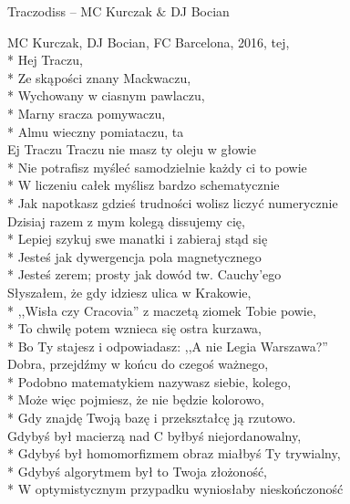 \begin{piosenka_dluga}{Traczodiss -- MC Kurczak $\&$ DJ Bocian}

MC Kurczak, DJ Bocian, FC Barcelona, 2016, tej, \\*
Hej Traczu, \\*
Ze skąpości znany Mackwaczu, \\*
Wychowany w ciasnym pawlaczu, \\*
Marny sracza pomywaczu, \\*
Almu wieczny pomiataczu, ta \\[\zwrotkaspace]

Ej Traczu Traczu nie masz ty oleju w głowie \\*
 Nie potrafisz myśleć samodzielnie każdy ci to powie \\*
W liczeniu całek myślisz bardzo schematycznie \\*
Jak napotkasz gdzieś trudności wolisz liczyć numerycznie \\[\zwrotkaspace]

Dzisiaj razem z mym kolegą dissujemy cię, \\*
Lepiej szykuj swe manatki i zabieraj stąd się \\*
Jesteś jak dywergencja pola magnetycznego \\*
Jesteś zerem; prosty jak dowód tw. Cauchy’ego \\[\zwrotkaspace]

Słyszałem, że gdy idziesz ulica w Krakowie, \\*
,,Wisła czy Cracovia'' z maczetą ziomek Tobie powie, \\*
To chwilę potem wznieca się ostra kurzawa, \\*
Bo Ty stajesz i odpowiadasz: ,,A nie Legia Warszawa?'' \\[\zwrotkaspace]

Dobra, przejdźmy w końcu do czegoś ważnego, \\*
Podobno matematykiem nazywasz siebie, kolego, \\*
Może więc pojmiesz, że nie będzie kolorowo, \\*
Gdy znajdę Twoją bazę i przekształcę ją rzutowo. \\[\zwrotkaspace]

Gdybyś był macierzą nad C byłbyś niejordanowalny, \\* 
Gdybyś był homomorfizmem obraz miałbyś Ty trywialny, \\*
Gdybyś algorytmem był to Twoja złożoność, \\*
W optymistycznym przypadku wyniosłaby nieskończoność \\[\zwrotkaspace]


\end{piosenka_dluga}
